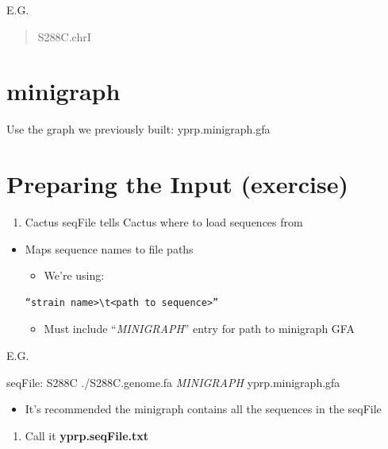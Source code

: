 \documentclass[
]{book}
\providecommand{\tightlist}{%
  \setlength{\itemsep}{0pt}\setlength{\parskip}{0pt}}
\begin{document}
E.G.

\begin{quote}
S288C.chrI
\end{quote}

\hypertarget{minigraph}{%
\section{minigraph}\label{minigraph}}

Use the graph we previously built: yprp.minigraph.gfa

\hypertarget{preparing-the-input-exercise}{%
\section{Preparing the Input (exercise)}\label{preparing-the-input-exercise}}

\begin{enumerate}
\def\labelenumi{\arabic{enumi}.}
\tightlist
\item
  Cactus seqFile tells Cactus where to load sequences from
\end{enumerate}

\begin{itemize}
\tightlist
\item
  Maps sequence names to file paths

  \begin{itemize}
  \tightlist
  \item
    We're using:
  \end{itemize}

\begin{verbatim}
“strain name>\t<path to sequence>”
\end{verbatim}

  \begin{itemize}
  \tightlist
  \item
    Must include ``\emph{MINIGRAPH}'' entry for path to minigraph GFA
  \end{itemize}
\end{itemize}

E.G.

seqFile:
S288C ./S288C.genome.fa \emph{MINIGRAPH} yprp.minigraph.gfa

\begin{itemize}
\tightlist
\item
  It's recommended the minigraph contains all the sequences in the seqFile
\end{itemize}

\begin{enumerate}
\def\labelenumi{\arabic{enumi}.}
\setcounter{enumi}{1}
\tightlist
\item
  Call it \textbf{yprp.seqFile.txt}
\end{enumerate}
\end{document}
